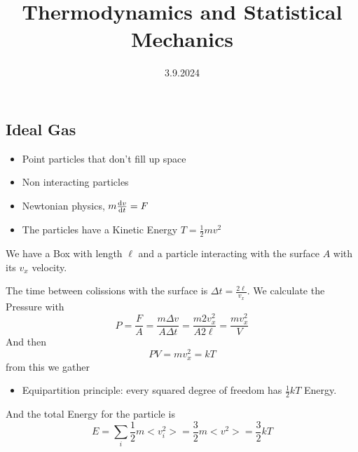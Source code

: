 \documentclass[]{scrartcl}
\title{Thermodynamics and Statistical Mechanics}
\author{}
\date{3.9.2024}
\begin{document}
\maketitle
\newpage
\tableofcontents
\newpage


\subsection{Ideal Gas}

\begin{itemize}
	\item Point particles that don't fill up space
	\item Non interacting particles
	\item Newtonian physics, $m\frac{\text d v}{\text d t} = F$
	\item The particles have a Kinetic Energy $T = \frac{1}{2}mv^2$

\end{itemize}

We have a Box with length $\ell$ and a particle interacting with the surface $A$ with its $v_x$ velocity.

The time between colissions with the surface is $\Delta t = \frac{2 \ell}{v_x}.$ We calculate the Pressure with
\begin{equation}
	P = \frac{F}{A} = \frac{m\Delta v}{A \Delta t} = \frac{m2v_x^2}{A2\ell} = \frac{mv_x^2}{V}
\end{equation}
And then
\begin{equation}
	PV = mv_x^2 = kT
\end{equation}
from this we gather
\begin{itemize}
	\item Equipartition principle: every squared degree of freedom has $\frac{1}{2}kT$ Energy.
\end{itemize}
And the total Energy for the particle is
\begin{equation}
	E = \sum_i \frac{1}{2}m<v_i^2> = \frac{3}{2}m<v^2> = \frac{3}{2}kT
\end{equation}
\end{document}
